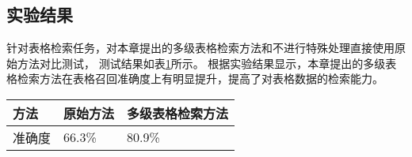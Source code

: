 \subsection{实验结果}
针对表格检索任务，对本章提出的多级表格检索方法和不进行特殊处理直接使用原始方法对比测试，
测试结果如表\ref{tab:table-retrival-results}所示。
根据实验结果显示，本章提出的多级表格检索方法在表格召回准确度上有明显提升，提高了对表格数据的检索能力。
\begin{table}[h]
    \centering
    \label{tab:table-retrival-results}
    \begin{tabularx}{\linewidth}{XXX}
        \toprule[1.5pt]
        {方法} & {原始方法} & {多级表格检索方法} \\
        \midrule[1pt]
        {准确度} & 66.3\% & 80.9\% \\
        \bottomrule[1.5pt]
    \end{tabularx}
\end{table}

